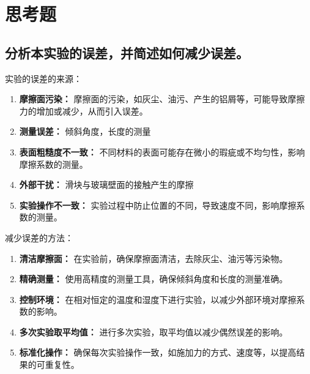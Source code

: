 \section{思考题}
\subsection{分析本实验的误差，并简述如何减少误差。}
实验的误差的来源：
\begin{enumerate}
    \item \textbf{摩擦面污染：} 摩擦面的污染，如灰尘、油污、产生的铝屑等，可能导致摩擦力的增加或减少，从而引入误差。
    
    \item \textbf{测量误差：} 倾斜角度，长度的测量
    
    \item \textbf{表面粗糙度不一致：} 不同材料的表面可能存在微小的瑕疵或不均匀性，影响摩擦系数的测量。
    
    \item \textbf{外部干扰：} 滑块与玻璃壁面的接触产生的摩擦
    \item \textbf{实验操作不一致：} 实验过程中防止位置的不同，导致速度不同，影响摩擦系数的测量。
\end{enumerate}
减少误差的方法：
\begin{enumerate}
    \item \textbf{清洁摩擦面：} 在实验前，确保摩擦面清洁，去除灰尘、油污等污染物。
    
    \item \textbf{精确测量：} 使用高精度的测量工具，确保倾斜角度和长度的测量准确。
    
    \item \textbf{控制环境：} 在相对恒定的温度和湿度下进行实验，以减少外部环境对摩擦系数的影响。
    
    \item \textbf{多次实验取平均值：} 进行多次实验，取平均值以减少偶然误差的影响。
    
    \item \textbf{标准化操作：} 确保每次实验操作一致，如施加力的方式、速度等，以提高结果的可重复性。
    
\end{enumerate}
